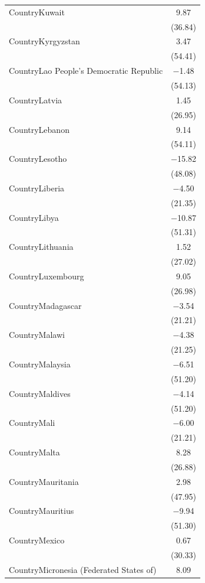 \documentclass[
  letterpaper,
  DIV=11,
  numbers=noendperiod]{scrartcl}
\begin{document}
\begin{table}
{\begin{tabular}[t]{lc}
CountryKuwait & \num{9.87}\\
 & (\num{36.84})\\
CountryKyrgyzstan & \num{3.47}\\
 & (\num{54.41})\\
CountryLao People's Democratic Republic & \num{-1.48}\\
 & (\num{54.13})\\
CountryLatvia & \num{1.45}\\
 & (\num{26.95})\\
CountryLebanon & \num{9.14}\\
 & (\num{54.11})\\
CountryLesotho & \num{-15.82}\\
 & \vphantom{1} (\num{48.08})\\
CountryLiberia & \num{-4.50}\\
 & (\num{21.35})\\
CountryLibya & \num{-10.87}\\
 & \vphantom{1} (\num{51.31})\\
CountryLithuania & \num{1.52}\\
 & (\num{27.02})\\
CountryLuxembourg & \num{9.05}\\
 & (\num{26.98})\\
CountryMadagascar & \num{-3.54}\\
 & \vphantom{2} (\num{21.21})\\
CountryMalawi & \num{-4.38}\\
 & (\num{21.25})\\
CountryMalaysia & \num{-6.51}\\
 & \vphantom{1} (\num{51.20})\\
CountryMaldives & \num{-4.14}\\
 & (\num{51.20})\\
CountryMali & \num{-6.00}\\
 & \vphantom{1} (\num{21.21})\\
CountryMalta & \num{8.28}\\
 & (\num{26.88})\\
CountryMauritania & \num{2.98}\\
 & \vphantom{1} (\num{47.95})\\
CountryMauritius & \num{-9.94}\\
 & (\num{51.30})\\
CountryMexico & \num{0.67}\\
 & (\num{30.33})\\
CountryMicronesia (Federated States of) & \num{8.09}\\

\end{tabular}}
\end{table}
\end{document}
